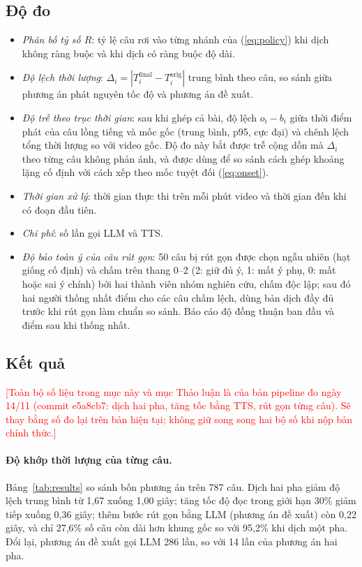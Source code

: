 \documentclass{IEEEtran}
\newcommand{\todo}[1]{\textcolor{red}{[#1]}}
\begin{document}
\subsection{Độ đo}
\begin{itemize}
\item \emph{Phân bố tỷ số $R$}: tỷ lệ câu rơi vào từng nhánh của (\ref{eq:policy}) khi dịch không ràng buộc và khi dịch có ràng buộc độ dài.
\item \emph{Độ lệch thời lượng}: $\Delta_i = |T_i^{\mathrm{final}} - T_i^{\mathrm{orig}}|$ trung bình theo câu, so sánh giữa phương án phát nguyên tốc độ và phương án đề xuất.
\item \emph{Độ trễ theo trục thời gian}: sau khi ghép cả bài, độ lệch $o_i - b_i$ giữa thời điểm phát của câu lồng tiếng và mốc gốc (trung bình, p95, cực đại) và chênh lệch tổng thời lượng so với video gốc. Độ đo này bắt được trễ cộng dồn mà $\Delta_i$ theo từng câu không phản ánh, và được dùng để so sánh cách ghép khoảng lặng cố định với cách xếp theo mốc tuyệt đối (\ref{eq:onset}).
\item \emph{Thời gian xử lý}: thời gian thực thi trên mỗi phút video và thời gian đến khi có đoạn đầu tiên.
\item \emph{Chi phí}: số lần gọi LLM và TTS.
\item \emph{Độ bảo toàn ý của câu rút gọn}: 50 câu bị rút gọn được chọn ngẫu nhiên (hạt giống cố định) và chấm trên thang 0--2 (2: giữ đủ ý, 1: mất ý phụ, 0: mất hoặc sai ý chính) bởi hai thành viên nhóm nghiên cứu, chấm độc lập; sau đó hai người thống nhất điểm cho các câu chấm lệch, dùng bản dịch đầy đủ trước khi rút gọn làm chuẩn so sánh. Báo cáo độ đồng thuận ban đầu và điểm sau khi thống nhất.
\end{itemize}

\subsection{Kết quả}
\label{sub:results}
\todo{Toàn bộ số liệu trong mục này và mục Thảo luận là của bản pipeline đo ngày 14/11 (commit e5a8cb7: dịch hai pha, tăng tốc bằng TTS, rút gọn từng câu). Sẽ thay bằng số đo lại trên bản hiện tại; không giữ song song hai bộ số khi nộp bản chính thức.}

\paragraph{Độ khớp thời lượng của từng câu.} Bảng~\ref{tab:results} so sánh bốn phương án trên 787 câu. Dịch hai pha giảm độ lệch trung bình từ 1,67 xuống 1,00 giây; tăng tốc độ đọc trong giới hạn 30\% giảm tiếp xuống 0,36 giây; thêm bước rút gọn bằng LLM (phương án đề xuất) còn 0,22 giây, và chỉ 27,6\% số câu còn dài hơn khung gốc so với 95,2\% khi dịch một pha. Đổi lại, phương án đề xuất gọi LLM 286 lần, so với 14 lần của phương án hai pha.
\end{document}
